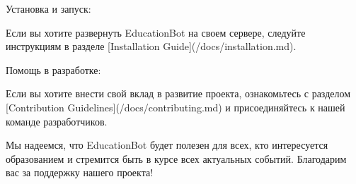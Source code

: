 \documentclass[letterpaper,10pt,russian]{sphinxmanual}
\begin{document}
\begin{sphinxVerbatim}[commandchars=\\\{\}]
\PYGZsh{}\PYGZsh{}\PYGZsh{} Установка и запуск:

Если вы хотите развернуть EducationBot на своем сервере, следуйте инструкциям в разделе [Installation Guide](/docs/installation.md).

\PYGZsh{}\PYGZsh{}\PYGZsh{} Помощь в разработке:

Если вы хотите внести свой вклад в развитие проекта, ознакомьтесь с разделом [Contribution Guidelines](/docs/contributing.md) и присоединяйтесь к нашей команде разработчиков.

Мы надеемся, что EducationBot будет полезен для всех, кто интересуется образованием и стремится быть в курсе всех актуальных событий. Благодарим вас за поддержку нашего проекта!

\end{sphinxVerbatim}

\sphinxstepscope
\end{document}

